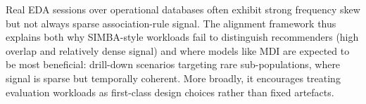 
Real EDA sessions over operational databases often exhibit strong frequency skew but not always sparse association-rule signal. The alignment framework thus explains both why SIMBA-style workloads fail to distinguish recommenders (high overlap and relatively dense signal) and where models like MDI are expected to be most beneficial: drill-down scenarios targeting rare sub-populations, where signal is sparse but temporally coherent. More broadly, it encourages treating evaluation workloads as first-class design choices rather than fixed artefacts.
